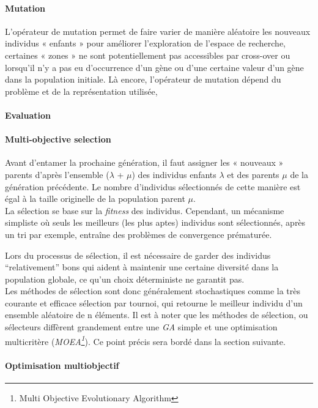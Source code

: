 \documentclass[12pt]{memoir}
\begin{document}
\paragraph{Mutation} %
\label{par:Mutation}
L’opérateur de mutation permet de faire varier de manière aléatoire les nouveaux
individus « enfants » pour améliorer l’exploration de l’espace de recherche, certaines «
zones » ne sont potentiellement pas accessibles par cross-over ou lorsqu’il n’y a pas eu
d’occurrence d’un gène ou d’une certaine valeur d’un gène dans la population initiale.
Là encore, l’opérateur de mutation dépend du problème et de la représentation utilisée,
\paragraph{Evaluation} %
\label{par:Evaluation}
\paragraph{Multi-objective selection } %
Avant d'entamer la prochaine génération, il faut assigner les « nouveaux
» parents d'après l'ensemble ($\lambda$ + $\mu$) des individus enfants
$\lambda$ et des parents $\mu$ de la génération précédente. Le nombre
d'individus sélectionnés de cette manière est égal à la taille
originelle de la population parent $\mu$. \\
La sélection se base sur la \emph{fitness} des individus. Cependant, un
mécanisme simpliste où seuls les meilleurs (les plus aptes) individus
sont sélectionnés, après un tri par exemple, entraîne des problèmes de
convergence prématurée.

\bigskip
Lors du processus de sélection, il est nécessaire de garder des
individus ``relativement\cite{sharma2010archived,deb2002fast}'' bons qui aident à maintenir une certaine
diversité dans la population globale, ce qu'un choix déterministe ne
garantit pas. \\
Les méthodes de sélection sont donc généralement stochastiques comme la
très courante et efficace sélection par tournoi, qui retourne le
meilleur individu d'un ensemble aléatoire de n éléments. 
Il est à noter que les méthodes de sélection, ou sélecteurs diffèrent
grandement entre une \emph{GA} simple et une optimisation multicritère
(\emph{MOEA\footnote{Multi Objective Evolutionary Algorithm}}). Ce point précis sera bordé dans la section suivante.

\paragraph{Optimisation
multiobjectif}\label{optimisation-multiobjectif}
\end{document}
